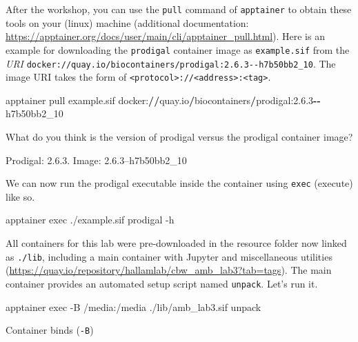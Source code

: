 \documentclass[
]{book}
\newenvironment{Shaded}{\begin{snugshade}}{\end{snugshade}}
\newcommand{\AttributeTok}[1]{\textcolor[rgb]{0.13,0.29,0.53}{#1}}
\newcommand{\ExtensionTok}[1]{#1}
\newcommand{\FloatTok}[1]{\textcolor[rgb]{0.00,0.00,0.81}{#1}}
\newcommand{\NormalTok}[1]{#1}
\newcommand{\OperatorTok}[1]{\textcolor[rgb]{0.81,0.36,0.00}{\textbf{#1}}}
\begin{document}
After the workshop, you can use the \texttt{pull} command of \texttt{apptainer} to obtain these tools on your (linux) machine
(additional documentation: \url{https://apptainer.org/docs/user/main/cli/apptainer_pull.html}).
Here is an example for downloading the \texttt{prodigal} container image as \texttt{example.sif} from the \emph{URI} \texttt{docker://quay.io/biocontainers/prodigal:2.6.3-\/-h7b50bb2\_10}.
The image URI takes the form of \texttt{\textless{}protocol\textgreater{}://\textless{}address\textgreater{}:\textless{}tag\textgreater{}}.

\begin{Shaded}
\begin{Highlighting}[numbers=left,,]
\NormalTok{apptainer pull example.sif docker:}\OperatorTok{//}\NormalTok{quay.io}\OperatorTok{/}\NormalTok{biocontainers}\OperatorTok{/}\NormalTok{prodigal:}\FloatTok{2.6.3}\OperatorTok{{-}{-}}\NormalTok{h7b50bb2\_10}
\end{Highlighting}
\end{Shaded}

What do you think is the version of prodigal versus the prodigal container image?

Prodigal: 2.6.3. Image: 2.6.3--h7b50bb2\_10

We can now run the prodigal executable inside the container using \texttt{exec} (execute) like so.

\begin{Shaded}
\begin{Highlighting}[]
\ExtensionTok{apptainer}\NormalTok{ exec ./example.sif prodigal }\AttributeTok{{-}h}
\end{Highlighting}
\end{Shaded}

All containers for this lab were pre-downloaded in the resource folder now linked as \texttt{./lib},
including a main container with Jupyter and miscellaneous utilities (\url{https://quay.io/repository/hallamlab/cbw_amb_lab3?tab=tags}).
The main container provides an automated setup script named \texttt{unpack}. Let's run it.

\begin{Shaded}
\begin{Highlighting}[]
\ExtensionTok{apptainer}\NormalTok{ exec }\AttributeTok{{-}B}\NormalTok{ /media:/media ./lib/amb\_lab3.sif unpack}
\end{Highlighting}
\end{Shaded}

Container binds (\texttt{-B})
\end{document}
